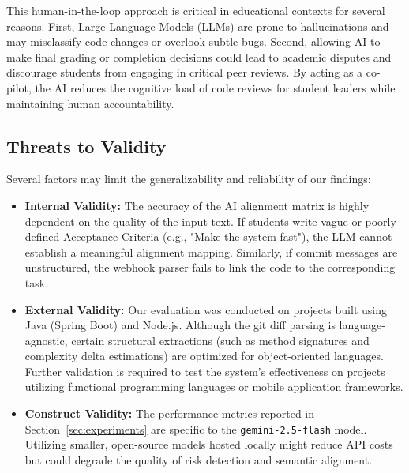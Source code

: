 This human-in-the-loop approach is critical in educational contexts for several reasons. First, Large Language Models (LLMs) are prone to hallucinations and may misclassify code changes or overlook subtle bugs. Second, allowing AI to make final grading or completion decisions could lead to academic disputes and discourage students from engaging in critical peer reviews. By acting as a co-pilot, the AI reduces the cognitive load of code reviews for student leaders while maintaining human accountability.

\subsection{Threats to Validity}

Several factors may limit the generalizability and reliability of our findings:
\begin{itemize}
    \item \textbf{Internal Validity:} The accuracy of the AI alignment matrix is highly dependent on the quality of the input text. If students write vague or poorly defined Acceptance Criteria (e.g., "Make the system fast"), the LLM cannot establish a meaningful alignment mapping. Similarly, if commit messages are unstructured, the webhook parser fails to link the code to the corresponding task.
    \item \textbf{External Validity:} Our evaluation was conducted on projects built using Java (Spring Boot) and Node.js. Although the git diff parsing is language-agnostic, certain structural extractions (such as method signatures and complexity delta estimations) are optimized for object-oriented languages. Further validation is required to test the system's effectiveness on projects utilizing functional programming languages or mobile application frameworks.
    \item \textbf{Construct Validity:} The performance metrics reported in Section~\ref{sec:experiments} are specific to the \texttt{gemini-2.5-flash} model. Utilizing smaller, open-source models hosted locally might reduce API costs but could degrade the quality of risk detection and semantic alignment.
\end{itemize}
